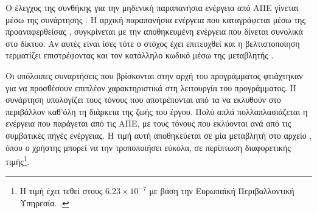 \documentclass[12pt]{report}
\begin{document}
{}

Ο έλεγχος της συνθήκης για την μηδενική παραπανήσια ενέργεια από ΑΠΕ γίνεται μέσω της συνάρτησης {\textbf{{}}}. Η αρχική παραπανήσια ενέργεια που καταγράφεται μέσω της προαναφερθείσας 
{\textbf{{}}}, συγκρίνεται με την αποθηκευμένη ενέργεια που δίνεται συνολικά στο δίκτυο. Αν αυτές είναι ίσες τότε ο στόχος έχει επιτευχθεί και η βελτιστοποίηση τερματίζει επιστρέφοντας και τον κατάλληλο
κωδικό μέσω της μεταβλητής {}.

{}

Οι υπόλοιπες συναρτήσεις που βρίσκονται στην αρχή του προγράμματος φτιάχτηκαν για να προσθέσουν επιπλέον χαρακτηριστικά στη λειτουργία του προγράμματος. Η συνάρτηση {\textbf{{}}} υπολογίζει τους τόνους
{} που αποτρέπονται από τα να εκλυθούν στο περιβάλλον καθ'όλη τη διάρκεια της ζωής του έργου. Πολύ απλά πολλαπλασιάζεται η ενέργεια που παράγεται από τις ΑΠΕ, με τους τόνους {} που εκλύονται
ανά {} από τις συμβατικές πηγές ενέργειας. Η τιμή αυτή αποθηκεύεται σε μία μεταβλητή στο αρχείο {}, όπου ο χρήστης μπορεί να την τροποποιήσει εύκολα, σε περίπτωση διαφορετικής τιμής\footnote{
Η τιμή έχει τεθεί στους \(6.23\times10^{-7}\) {} με βάση την Ευρωπαϊκή Περιβαλλοντική Υπηρεσία. {} .}.  
\end{document}
